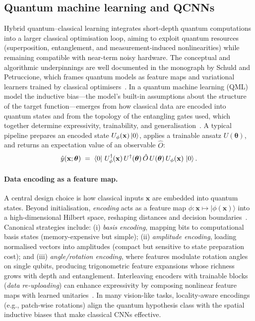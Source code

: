 \subsection{Quantum machine learning and QCNNs}\label{sec:qml-qcnn}
Hybrid quantum--classical learning integrates short-depth quantum computations into a larger classical optimisation loop, aiming to exploit quantum resources (superposition, entanglement, and measurement-induced nonlinearities) while remaining compatible with near-term noisy hardware. The conceptual and algorithmic underpinnings are well documented in the monograph by Schuld and Petruccione, which frames quantum models as feature maps and variational learners trained by classical optimisers~\cite{SchuldPetruccione2021}. In a quantum machine learning (QML) model the inductive bias---the model's built-in assumptions about the structure of the target function---emerges from how classical data are encoded into quantum states and from the topology of the entangling gates used, which together determine expressivity, trainability, and generalisation~\cite{Benedetti2019,cerezo2021}. A typical pipeline prepares an encoded state $U_{\phi}(\mathbf{x})\ket{0}$, applies a trainable ansatz $U(\boldsymbol{\theta})$, and returns an expectation value of an observable $\hat{O}$:
\begin{equation}
\hat{y}(\mathbf{x};\boldsymbol{\theta}) \;=\;
\bra{0}\,U_{\phi}^{\dagger}(\mathbf{x})\,U^{\dagger}(\boldsymbol{\theta})\,
\hat{O}\,U(\boldsymbol{\theta})\,U_{\phi}(\mathbf{x})\,\ket{0}.
\label{eq:q-model}
\end{equation}

\paragraph{Data encoding as a feature map.}
A central design choice is how classical inputs $\mathbf{x}$ are embedded into quantum states. Beyond initialisation, \emph{encoding} acts as a feature map $\phi:\mathbf{x}\mapsto \lvert \phi(\mathbf{x})\rangle$ into a high-dimensional Hilbert space, reshaping distances and decision boundaries~\cite{SchuldPetruccione2021,Schuld2019PRA}. Canonical strategies include: (i) \emph{basis encoding}, mapping bits to computational basis states (memory-expensive but simple); (ii) \emph{amplitude encoding}, loading normalised vectors into amplitudes (compact but sensitive to state preparation cost); and (iii) \emph{angle/rotation encoding}, where features modulate rotation angles on single qubits, producing trigonometric feature expansions whose richness grows with depth and entanglement. Interleaving encoders with trainable blocks (\emph{data re-uploading}) can enhance expressivity by composing nonlinear feature maps with learned unitaries~\cite{PerezSalinas2020,Schuld2020Expressivity}. In many vision-like tasks, locality-aware encodings (e.g., patch-wise rotations) align the quantum hypothesis class with the spatial inductive biases that make classical CNNs effective.


